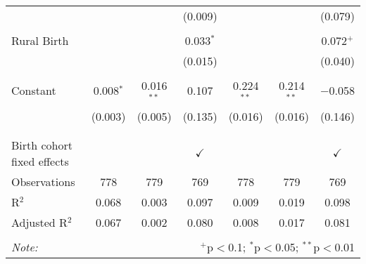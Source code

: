 \begin{table}[!htbp]
\begin{tabular}{@{\extracolsep{5pt}}lcccccc}
  &  &  & (0.009) &  &  & (0.079) \\ 
  & & & & & & \\ 
 Rural Birth &  &  & 0.033$^{*}$ &  &  & 0.072$^{+}$ \\ 
  &  &  & (0.015) &  &  & (0.040) \\ 
  & & & & & & \\ 
 Constant & 0.008$^{*}$ & 0.016$^{**}$ & 0.107 & 0.224$^{**}$ & 0.214$^{**}$ & $-$0.058 \\ 
  & (0.003) & (0.005) & (0.135) & (0.016) & (0.016) & (0.146) \\ 
  & & & & & & \\ 
\hline \\[-1.8ex] 
Birth cohort fixed effects &  &  & $\checkmark$ &  &  & $\checkmark$ \\ 
Observations & 778 & 779 & 769 & 778 & 779 & 769 \\ 
R$^{2}$ & 0.068 & 0.003 & 0.097 & 0.009 & 0.019 & 0.098 \\ 
Adjusted R$^{2}$ & 0.067 & 0.002 & 0.080 & 0.008 & 0.017 & 0.081 \\ 
\hline 
\hline \\[-1.8ex] 
\textit{Note:}  & \multicolumn{6}{r}{$^{+}$p$<$0.1; $^{*}$p$<$0.05; $^{**}$p$<$0.01}} \\ 
\end{tabular} 
\end{table} 
